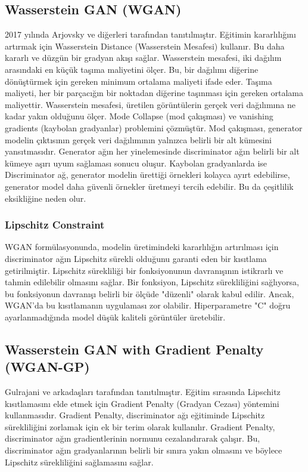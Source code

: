\subsection{Wasserstein GAN (WGAN)}
2017 yılında Arjovsky ve diğerleri tarafından tanıtılmıştır. Eğitimin kararlılığını artırmak için Wasserstein Distance (Wasserstein Mesafesi) kullanır. Bu daha kararlı ve düzgün bir gradyan akışı sağlar.  Wasserstein mesafesi, iki dağılım arasındaki en küçük taşıma maliyetini ölçer. Bu, bir dağılımı diğerine dönüştürmek için gereken minimum ortalama maliyeti ifade eder. Taşıma maliyeti, her bir parçacığın bir noktadan diğerine taşınması için gereken ortalama maliyettir. Wasserstein mesafesi, üretilen görüntülerin gerçek veri dağılımına ne kadar yakın olduğunu ölçer. Mode Collapse (mod çakışması) ve vanishing gradients (kaybolan gradyanlar) problemini çözmüştür. Mod çakışması, generator modelin çıktısının gerçek veri dağılımının yalnızca belirli bir alt kümesini yansıtmasıdır. Generator ağın her yinelemesinde discriminator ağın belirli bir alt kümeye aşırı uyum sağlaması sonucu oluşur. Kaybolan gradyanlarda ise Discriminator ağ, generator modelin ürettiği örnekleri kolayca ayırt edebilirse, generator model daha güvenli örnekler üretmeyi tercih edebilir. Bu da çeşitlilik eksikliğine neden olur.

\newpage

\subsubsection{Lipschitz Constraint}
WGAN formülasyonunda, modelin üretimindeki kararlılığın artırılması için discriminator ağın Lipschitz sürekli olduğunu garanti eden bir kısıtlama getirilmiştir. Lipschitz sürekliliği bir fonksiyonunun davranışının istikrarlı ve tahmin edilebilir olmasını sağlar. Bir fonksiyon, Lipschitz sürekliliğini sağlıyorsa, bu fonksiyonun davranışı belirli bir ölçüde "düzenli" olarak kabul edilir. Ancak, WGAN'da bu kısıtlamanın uygulaması zor olabilir. Hiperparametre "C" doğru ayarlanmadığında model düşük kaliteli görüntüler üretebilir.

\newpage

\subsection{Wasserstein GAN with Gradient Penalty (WGAN-GP)}
Gulrajani ve arkadaşları tarafından tanıtılmıştır. Eğitim sırasında Lipschitz kısıtlamasını elde etmek için Gradient Penalty (Gradyan Cezası) yöntemini kullanmasıdır. Gradient Penalty, discriminator ağı eğitiminde Lipschitz sürekliliğini zorlamak için ek bir terim olarak kullanılır. Gradient Penalty, discriminator ağın gradientlerinin normunu cezalandırarak çalışır. Bu, discriminator ağın gradyanlarının belirli bir sınıra yakın olmasını ve böylece Lipschitz sürekliliğini sağlamasını sağlar.

